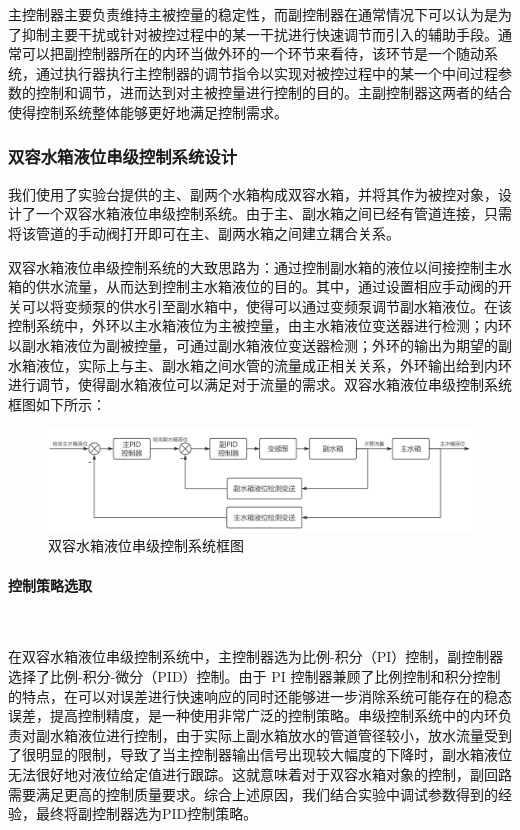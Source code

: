 \documentclass[UTF8]{article}
\begin{document}
主控制器主要负责维持主被控量的稳定性，而副控制器在通常情况下可以认为是为了抑制主要干扰或针对被控过程中的某一干扰进行快速调节而引入的辅助手段。通常可以把副控制器所在的内环当做外环的一个环节来看待，该环节是一个随动系统，通过执行器执行主控制器的调节指令以实现对被控过程中的某一个中间过程参数的控制和调节，进而达到对主被控量进行控制的目的。主副控制器这两者的结合使得控制系统整体能够更好地满足控制需求。

\subsubsection{双容水箱液位串级控制系统设计}
我们使用了实验台提供的主、副两个水箱构成双容水箱，并将其作为被控对象，设计了一个双容水箱液位串级控制系统。由于主、副水箱之间已经有管道连接，只需将该管道的手动阀打开即可在主、副两水箱之间建立耦合关系。

双容水箱液位串级控制系统的大致思路为：通过控制副水箱的液位以间接控制主水箱的供水流量，从而达到控制主水箱液位的目的。其中，通过设置相应手动阀的开关可以将变频泵的供水引至副水箱中，使得可以通过变频泵调节副水箱液位。在该控制系统中，外环以主水箱液位为主被控量，由主水箱液位变送器进行检测；内环以副水箱液位为副被控量，可通过副水箱液位变送器检测；外环的输出为期望的副水箱液位，实际上与主、副水箱之间水管的流量成正相关关系，外环输出给到内环进行调节，使得副水箱液位可以满足对于流量的需求。双容水箱液位串级控制系统框图如下所示：
\begin{figure}[H]
    \centering %
    \includegraphics[width=1\textwidth]{figure/双容水箱控制系统框图.png} 
    \caption{双容水箱液位串级控制系统框图} %
\end{figure}

\paragraph{控制策略选取}~{}

在双容水箱液位串级控制系统中，主控制器选为比例-积分（PI）控制，副控制器选择了比例-积分-微分（PID）控制。由于 PI 控制器兼顾了比例控制和积分控制的特点，在可以对误差进行快速响应的同时还能够进一步消除系统可能存在的稳态误差，提高控制精度，是一种使用非常广泛的控制策略。串级控制系统中的内环负责对副水箱液位进行控制，由于实际上副水箱放水的管道管径较小，放水流量受到了很明显的限制，导致了当主控制器输出信号出现较大幅度的下降时，副水箱液位无法很好地对液位给定值进行跟踪。这就意味着对于双容水箱对象的控制，副回路需要满足更高的控制质量要求。综合上述原因，我们结合实验中调试参数得到的经验，最终将副控制器选为PID控制策略。
\end{document}
